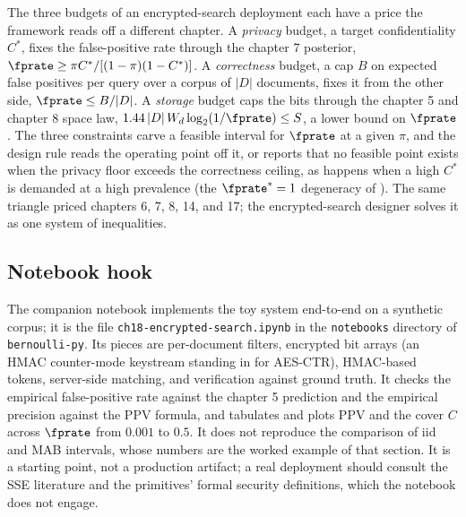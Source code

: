 \begin{remark}
\label{rem:design-language}
The three budgets of an encrypted-search deployment each have a price the
framework reads off a different chapter. A \emph{privacy} budget, a target
confidentiality $C^*$, fixes the false-positive rate through the chapter 7
posterior, $\fprate \ge \pi C^* / [(1 - \pi)(1 - C^*)]$. A \emph{correctness}
budget, a cap $B$ on expected false positives per query over a corpus of
$|D|$ documents, fixes it from the other side, $\fprate \le B/|D|$. A
\emph{storage} budget caps the bits through the chapter 5 and chapter 8
space law, $1.44\,|D|\,W_d \log_2(1/\fprate) \le S$, a lower bound on
$\fprate$. The three constraints carve a feasible interval for $\fprate$
at a given $\pi$, and the design rule reads the operating point off it, or
reports that no feasible point exists when the privacy floor exceeds the
correctness ceiling, as happens when a high $C^*$ is demanded at a high
prevalence (the $\fprate^* = 1$ degeneracy of ).
The same triangle priced chapters 6, 7, 8, 14, and 17; the encrypted-search
designer solves it as one system of inequalities.
\end{remark}

\subsection*{Notebook hook}

{\sloppy
The companion notebook implements the toy system end-to-end on a
synthetic corpus; it is the file \texttt{ch18-encrypted-search.ipynb} in
the \texttt{notebooks} directory of \texttt{bernoulli-py}. Its pieces are per-document filters, encrypted bit arrays (an HMAC counter-mode
keystream standing in for AES-CTR), HMAC-based tokens, server-side
matching, and verification against ground truth. It checks the empirical
false-positive rate against the chapter 5 prediction and the empirical
precision against the PPV formula, and tabulates and plots PPV and the
cover $C$ across $\fprate$ from $0.001$ to $0.5$. It does not reproduce
the  comparison of iid and MAB
intervals, whose numbers are the worked example of that section. It is a
starting point, not a production artifact; a real deployment should
consult the SSE literature and the primitives' formal security
definitions, which the notebook does not engage.\par}

